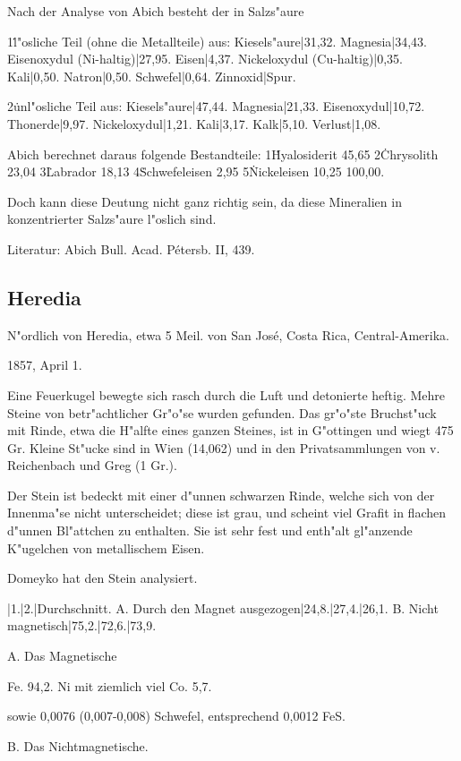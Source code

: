\documentclass[a4paper, 11pt, oneside]{article}
\begin{document}
Nach der Analyse von Abich besteht der in Salzs"aure

1\. l"osliche Teil (ohne die Metallteile) aus:  
Kiesels"aure|31,32.  
Magnesia|34,43.  
Eisenoxydul (Ni-haltig)|27,95.  
Eisen|4,37.  
Nickeloxydul (Cu-haltig)|0,35.  
Kali|0,50.  
Natron|0,50.  
Schwefel|0,64.  
Zinnoxid|Spur.

2\. unl"osliche Teil aus:
Kiesels"aure|47,44.  
Magnesia|21,33.  
Eisenoxydul|10,72.  
Thonerde|9,97.  
Nickeloxydul|1,21.  
Kali|3,17.  
Kalk|5,10.  
Verlust|1,08.

Abich berechnet daraus folgende Bestandteile:
1\. Hyalosiderit 45,65  
2\. Chrysolith  23,04  
3\. Labrador 18,13  
4\. Schwefeleisen 2,95  
5\. Nickeleisen 10,25  
100,00.

Doch kann diese Deutung nicht ganz richtig sein, da diese Mineralien in konzentrierter Salzs"aure l"oslich sind.

Literatur: Abich Bull. Acad. Pétersb. II, 439.

\subsection{Heredia}

N"ordlich von Heredia, etwa 5 Meil. von San José, Costa Rica, Central-Amerika.

1857, April 1.

Eine Feuerkugel bewegte sich rasch durch die Luft und detonierte heftig. Mehre Steine von betr"achtlicher Gr"o"se wurden gefunden. Das gr"o"ste Bruchst"uck mit Rinde, etwa die H"alfte eines ganzen Steines, ist in G"ottingen und wiegt 475 Gr. Kleine St"ucke sind in Wien (14,062) und in den Privatsammlungen von v. Reichenbach und Greg (1 Gr.).

Der Stein ist bedeckt mit einer d"unnen schwarzen Rinde, welche sich von der Innenma"se nicht unterscheidet; diese ist grau, und scheint viel Grafit in flachen d"unnen Bl"attchen zu enthalten. Sie ist sehr fest und enth"alt gl"anzende K"ugelchen von metallischem Eisen.

Domeyko hat den Stein analysiert.

|1.|2.|Durchschnitt.
A. Durch den Magnet ausgezogen|24,8.|27,4.|26,1.  
B. Nicht magnetisch|75,2.|72,6.|73,9.

A. Das Magnetische

Fe. 94,2.  
Ni mit ziemlich viel Co. 5,7.

sowie 0,0076 (0,007-0,008) Schwefel, entsprechend 0,0012 FeS.

B. Das Nichtmagnetische.
\end{document}
